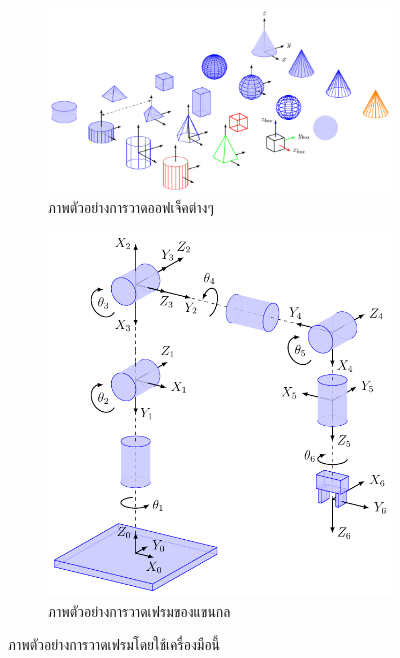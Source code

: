 \begin{figure}[!ht]
    \centering
    \begin{subfigure}[b]{0.45\textwidth}
        \centering
        \includegraphics[width=\textwidth]{chapter4/images/uthai_tools/basic-shapes.png}
        \caption{ภาพตัวอย่างการวาดออฟเจ็คต่างๆ}
    \end{subfigure}
    \hfill
    \begin{subfigure}[b]{0.45\textwidth}
        \centering
        \includegraphics[width=\textwidth]{chapter4/images/uthai_tools/test_robot.png}
        \caption{ภาพตัวอย่างการวาดเฟรมของแขนกล}
    \end{subfigure}
    \caption{ภาพตัวอย่างการวาดเฟรมโดยใช้เครื่องมือนี้}
\end{figure}
